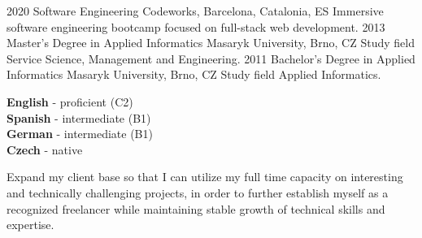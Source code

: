 \documentclass[9pt]{developercv}
\begin{document}

\begin{entrylist}
  \entry
  {2020}
  {Software Engineering}
  {Codeworks, Barcelona, Catalonia, ES}
  {Immersive software engineering bootcamp focused on full-stack web development.}
  \entry
  {2013}
  {Master's Degree in Applied Informatics}
  {Masaryk University, Brno, CZ}
  {Study field Service Science, Management and Engineering.}
  \entry
  {2011}
  {Bachelor's Degree  in Applied Informatics}
  {Masaryk University, Brno, CZ}
  {Study field Applied Informatics.}
\end{entrylist}


\begin{minipage}[t]{0.45\textwidth}
  \vspace{-\baselineskip}


  \textbf{English} - proficient (C2)\\
  \textbf{Spanish} - intermediate (B1)\\
  \textbf{German} - intermediate (B1)\\
  \textbf{Czech} - native
\end{minipage}
\begin{minipage}[t]{0.55\textwidth}
  \vspace{-\baselineskip}


  Expand my client base so that I can utilize my full time capacity on interesting and technically challenging projects, in order to further establish myself as a recognized freelancer while maintaining stable growth of technical skills and expertise.
\end{minipage}
\end{document}
